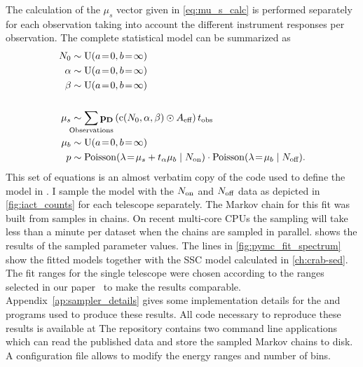The calculation of the $\mu_s$ vector given in \cref{eq:mu_s_calc} is performed separately for each observation taking into 
account the different instrument responses per observation.
The complete statistical model can be summarized as 
\begin{align*}
  N_0 &\sim \operatorname{U}(a\! =\!0, b\! = \!\infty) \\
  \alpha &\sim \operatorname{U}(a\! =\!0, b\! = \!\infty) \\
  \beta &\sim \operatorname{U}(a\! =\!0, b\! = \!\infty) \\
  \quad \\
  \mu_s &\sim \sum_{\mathclap{\text{Observations}}} \edisp \, (\operatorname{c}(N_0, \alpha, \beta) \odot \aeff) \, \tobs \\
  \mu_b &\sim  \operatorname{U}(a\! =\!0, b\! = \!\infty)
  \quad \\
  p &\sim \operatorname{Poisson}(\lambda\! =\!\mu_s + \talpha \mu_b \mid \Non) \cdot \operatorname{Poisson}(\lambda\! =\! \mu_b \mid \Noff).
\end{align*}
This set of equations is an almost verbatim copy of the \pymc code used to define the model in \python.
I sample the model with the $N_\text{on}$ and $N_\text{off}$ data as depicted in \cref{fig:iact_counts} for each telescope separately.
The Markov chain for this fit was built 
from  samples in  chains. 
On recent multi-core CPUs the sampling will take less than a minute per dataset when the chains are sampled in parallel.
 shows the results of the sampled parameter values. The lines in \cref{fig:pymc_fit_spectrum} show the fitted models 
together with the SSC model calculated in \cref{ch:crab-sed}.
The fit ranges for the single telescope were chosen according to the ranges selected in our paper~\cite{joint_crab} to make the results comparable.
Appendix~\ref{ap:sampler_details} gives some implementation details for the \pymc and \theano programs used to produce these results. 
All code necessary to reproduce these results is available at
The repository contains two command line applications which can read the published data and store the sampled Markov chains to disk. 
A configuration file allows to modify the energy ranges and number of bins.

